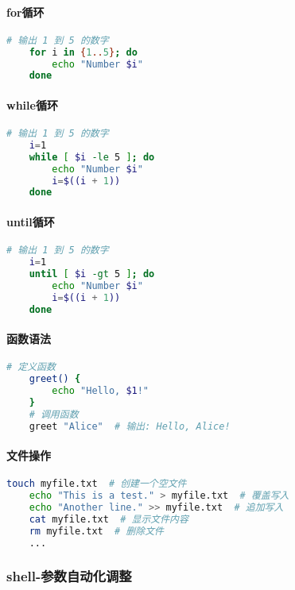 \paragraph{for循环}
\begin{lstlisting}[language=sh,caption={for-循环语法},label=code:shell_base4]
	# 输出 1 到 5 的数字
	for i in {1..5}; do
		echo "Number $i"
	done
\end{lstlisting}


\paragraph{while循环}
\begin{lstlisting}[language=sh,caption={while-循环语法},label=code:shell_base5]
	# 输出 1 到 5 的数字
	i=1
	while [ $i -le 5 ]; do
		echo "Number $i"
		i=$((i + 1))
	done
\end{lstlisting}


\paragraph{until循环}
\begin{lstlisting}[language=sh,caption={until-循环语法},label=code:shell_base6]
	# 输出 1 到 5 的数字
	i=1
	until [ $i -gt 5 ]; do
		echo "Number $i"
		i=$((i + 1))
	done
\end{lstlisting}


\paragraph{函数语法}
\begin{lstlisting}[language=sh,caption={函数},label=code:shell_base7]
	# 定义函数
	greet() {
		echo "Hello, $1!"
	}
	# 调用函数
	greet "Alice"  # 输出: Hello, Alice!
\end{lstlisting}


\paragraph{文件操作}
\begin{lstlisting}[language=sh,caption={文件操作},label=code:shell_base8]
	touch myfile.txt  # 创建一个空文件
	echo "This is a test." > myfile.txt  # 覆盖写入
	echo "Another line." >> myfile.txt  # 追加写入
	cat myfile.txt  # 显示文件内容
	rm myfile.txt  # 删除文件
	...
\end{lstlisting}

\subsubsection{shell-参数自动化调整}

